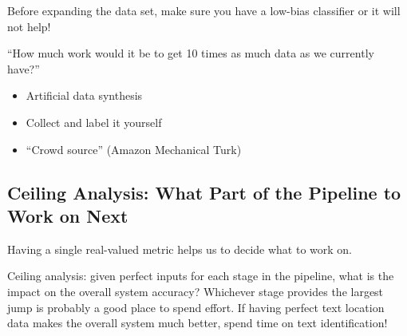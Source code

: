 Before expanding the data set, make sure you have a low-bias classifier or it will not help!

``How much work would it be to get 10 times as much data as we currently have?''

\begin{itemize}
    \item Artificial data synthesis
    \item Collect and label it yourself
    \item ``Crowd source'' (Amazon Mechanical Turk)
\end{itemize}

\subsection{Ceiling Analysis: What Part of the Pipeline to Work on Next}

Having a single real-valued metric helps us to decide what to work on.

Ceiling analysis: given perfect inputs for each stage in the pipeline,
what is the impact on the overall system accuracy?
Whichever stage provides the largest jump is probably a good place to spend effort.
If having perfect text location data makes the overall system much better, spend time
on text identification!
